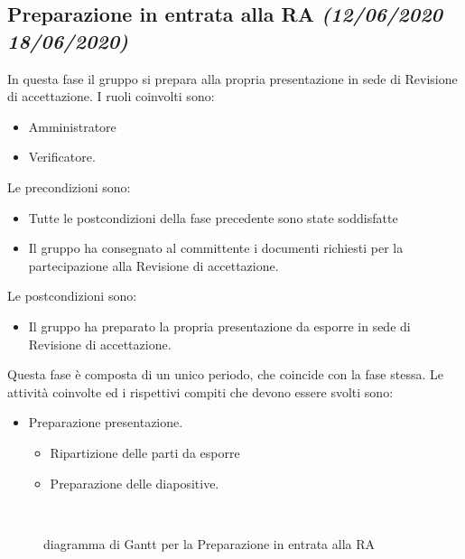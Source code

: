 \documentclass[../piano-di-progetto.tex]{subfiles}
\begin{document}
\subsection[Preparazione in entrata alla RA]{Preparazione in entrata alla RA {\normalsize\normalfont\itshape(12/06/2020  18/06/2020)}}%
\label{sub:preparazione_in_entrata_alla_ra}
In questa fase il gruppo si prepara alla propria presentazione in sede di Revisione di accettazione.
I ruoli coinvolti sono:
\begin{itemize}
  \item Amministratore
  \item Verificatore.
\end{itemize}
Le precondizioni sono:
\begin{itemize}
  \item Tutte le postcondizioni della fase precedente sono state soddisfatte
  \item Il gruppo ha consegnato al committente i documenti richiesti per la partecipazione alla Revisione di accettazione.
\end{itemize}
Le postcondizioni sono:
\begin{itemize}
  \item Il gruppo ha preparato la propria presentazione da esporre in sede di Revisione di accettazione.
\end{itemize}
Questa fase è composta di un unico periodo, che coincide con la fase stessa.
Le attività coinvolte ed i rispettivi compiti che devono essere svolti sono:
\begin{itemize}
  \item Preparazione presentazione.
  \begin{itemize}
    \item Ripartizione delle parti da esporre
    \item Preparazione delle diapositive.
  \end{itemize}
\end{itemize}
\begin{figure}[H]
  \centering
  
  \caption{diagramma di Gantt per la Preparazione in entrata alla RA}%
~~\label{fig:gantt_preparazione_ra}
\end{figure}
\end{document}
